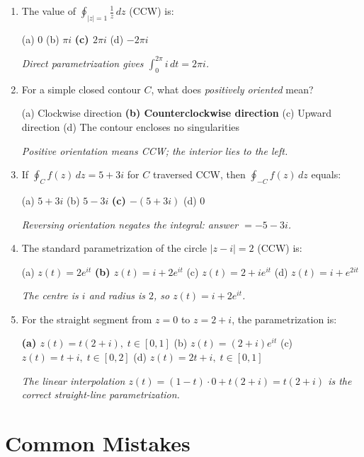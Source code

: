 \documentclass[12pt,a4paper]{article}
\begin{document}
\begin{enumerate}[leftmargin=2em]

\item The value of $\displaystyle\oint_{|z|=1} \frac{1}{z}\,dz$ (CCW) is:

(a) $0$ \quad (b) $\pi i$ \quad \textbf{(c) $2\pi i$} \quad (d) $-2\pi i$

\textit{Direct parametrization gives $\int_0^{2\pi}i\,dt = 2\pi i$.}

\item For a simple closed contour $C$, what does \emph{positively oriented} mean?

(a) Clockwise direction \quad \textbf{(b) Counterclockwise direction} \quad
(c) Upward direction \quad (d) The contour encloses no singularities

\textit{Positive orientation means CCW; the interior lies to the left.}

\item If $\oint_C f(z)\,dz = 5+3i$ for $C$ traversed CCW, then
$\oint_{-C} f(z)\,dz$ equals:

(a) $5+3i$ \quad (b) $5-3i$ \quad \textbf{(c) $-(5+3i)$} \quad (d) $0$

\textit{Reversing orientation negates the integral: answer $= -5-3i$.}

\item The standard parametrization of the circle $|z - i| = 2$ (CCW) is:

(a) $z(t)=2e^{it}$ \quad \textbf{(b) $z(t)=i+2e^{it}$} \quad
(c) $z(t)=2+ie^{it}$ \quad (d) $z(t)=i+e^{2it}$

\textit{The centre is $i$ and radius is $2$, so $z(t)=i+2e^{it}$.}

\item For the straight segment from $z=0$ to $z=2+i$, the parametrization is:

\textbf{(a) $z(t) = t(2+i),\; t\in[0,1]$} \quad
(b) $z(t) = (2+i)e^{it}$ \quad
(c) $z(t) = t + i,\; t\in[0,2]$ \quad
(d) $z(t) = 2t + i,\; t\in[0,1]$

\textit{The linear interpolation $z(t)=(1-t)\cdot 0 + t(2+i) = t(2+i)$ is
the correct straight-line parametrization.}

\end{enumerate}

\section{Common Mistakes}
\end{document}
